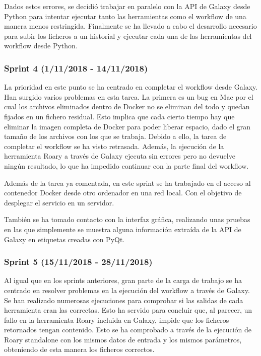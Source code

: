Dados estos errores, se decidió trabajar en paralelo con la API de Galaxy desde Python para intentar ejecutar tanto las herramientas como el workflow de una manera menos restringida. Finalmente se ha llevado a cabo el desarrollo necesario para subir los ficheros a un historial y ejecutar cada una de las herramientas del workflow desde Python.

\subsubsection{Sprint 4 (1/11/2018 - 14/11/2018)}
La prioridad en este punto se ha centrado en completar el workflow desde Galaxy. Han surgido varios problemas en esta tarea. La primera es un bug en Mac por el cual los archivos eliminados dentro de Docker no se eliminan del todo y quedan fijados en un fichero residual. Esto implica que cada cierto tiempo hay que eliminar la imagen completa de Docker para poder liberar espacio, dado el gran tamaño de los archivos con los que se trabaja. Debido a ello, la tarea de completar el workflow se ha visto retrasada. Además, la ejecución de la herramienta Roary a través de Galaxy ejecuta sin errores pero no devuelve ningún resultado, lo que ha impedido continuar con la parte final del workflow. 

Además de la tarea ya comentada, en este sprint se ha trabajado en el acceso al contenedor Docker desde otro ordenador en una red local. Con el objetivo de desplegar el servicio en un servidor.

También se ha tomado contacto con la interfaz gráfica, realizando unas pruebas en las que simplemente se muestra alguna información extraída de la API de Galaxy en etiquetas creadas con PyQt.

\subsubsection{Sprint 5 (15/11/2018 - 28/11/2018)}
Al igual que en los sprints anteriores, gran parte de la carga de trabajo se ha centrado en resolver problemas en la ejecución del workflow a través de Galaxy. Se han realizado numerosas ejecuciones para comprobar si las salidas de cada herramienta eran las correctas. Esto ha servido para concluir que, al parecer, un fallo en la herramienta Roary incluida en Galaxy, impide que los ficheros retornados tengan contenido. Esto se ha comprobado a través de la ejecución de Roary standalone con los mismos datos de entrada y los mismos parámetros, obteniendo de esta manera los ficheros correctos.

